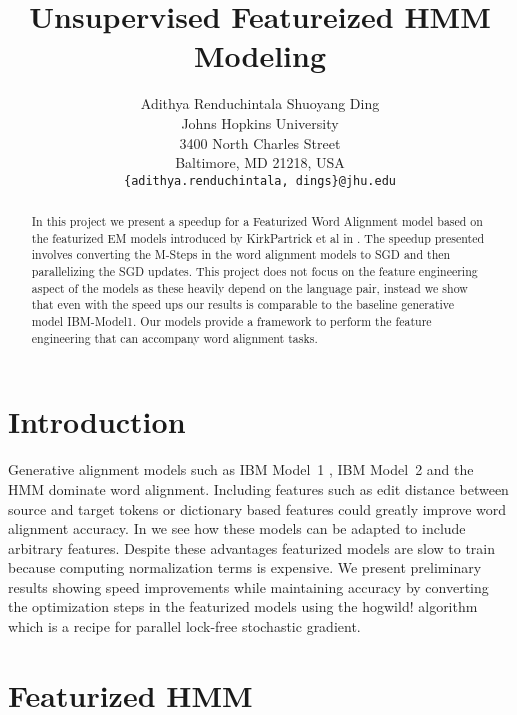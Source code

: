 \documentclass[11pt,letterpaper]{article}
\title{Unsupervised Featureized HMM Modeling}
\author{Adithya Renduchintala
  \quad\quad Shuoyang Ding\\
  Johns Hopkins University\\
  3400 North Charles Street\\
  Baltimore, MD 21218, USA\\
  {\tt \{adithya.renduchintala, dings\}@jhu.edu}}
\date{}
\begin{document}
\maketitle
\begin{abstract}
In this project we present a speedup for a Featurized Word Alignment model based on the featurized EM models introduced by KirkPartrick et al in \cite{berg2010painless}. The speedup presented involves converting the M-Steps in the word alignment models to SGD and then parallelizing the SGD updates. This project does not focus on the feature engineering aspect of the models as these heavily depend on the language pair, instead we show that even with the speed ups our results is comparable to the baseline generative model IBM-Model1. Our models provide a framework to perform the feature engineering that can accompany word alignment tasks.
\end{abstract}

\section{Introduction}
Generative alignment models such as IBM Model~1 \cite{brown1993mathematics}, IBM Model~2 and the HMM dominate word alignment. Including features such as edit distance between source and target tokens or dictionary based features could greatly improve word alignment accuracy. In \cite{berg2010painless} we see how these models can be adapted to include arbitrary features. Despite these advantages featurized models are slow to train because  computing normalization terms is expensive. We present preliminary results showing speed improvements while maintaining accuracy by converting the optimization steps in the featurized models using the hogwild! algorithm \cite{recht2011hogwild} which is a recipe for parallel lock-free stochastic gradient.

\section{Featurized HMM}
\end{document}
